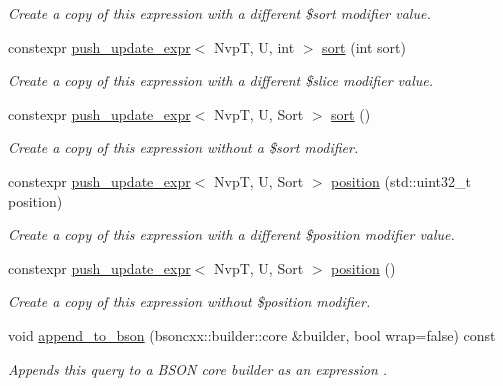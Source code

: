 \begin{DoxyCompactItemize}
\begin{DoxyCompactList}\small\item\em Create a copy of this expression with a different \$sort modifier value. \end{DoxyCompactList}\item 
constexpr \hyperlink{classmongo__odm_1_1push__update__expr}{push\+\_\+update\+\_\+expr}$<$ NvpT, U, int $>$ \hyperlink{classmongo__odm_1_1push__update__expr_a690edf21a68ce63bd576cc94e9a34f0f}{sort} (int sort)
\begin{DoxyCompactList}\small\item\em Create a copy of this expression with a different \$slice modifier value. \end{DoxyCompactList}\item 
constexpr \hyperlink{classmongo__odm_1_1push__update__expr}{push\+\_\+update\+\_\+expr}$<$ NvpT, U, Sort $>$ \hyperlink{classmongo__odm_1_1push__update__expr_a95965b5ab76f0e6da15de477fad2e829}{sort} ()
\begin{DoxyCompactList}\small\item\em Create a copy of this expression without a \$sort modifier. \end{DoxyCompactList}\item 
constexpr \hyperlink{classmongo__odm_1_1push__update__expr}{push\+\_\+update\+\_\+expr}$<$ NvpT, U, Sort $>$ \hyperlink{classmongo__odm_1_1push__update__expr_adb225c5e9549be9c7d790aff4bdcf856}{position} (std\+::uint32\+\_\+t position)
\begin{DoxyCompactList}\small\item\em Create a copy of this expression with a different \$position modifier value. \end{DoxyCompactList}\item 
constexpr \hyperlink{classmongo__odm_1_1push__update__expr}{push\+\_\+update\+\_\+expr}$<$ NvpT, U, Sort $>$ \hyperlink{classmongo__odm_1_1push__update__expr_a3875e3422e3c659c1bcc71a3632058b7}{position} ()
\begin{DoxyCompactList}\small\item\em Create a copy of this expression without \$position modifier. \end{DoxyCompactList}\item 
void \hyperlink{classmongo__odm_1_1push__update__expr_afa0ecdb64932eff8dd929b7f108a1441}{append\+\_\+to\+\_\+bson} (bsoncxx\+::builder\+::core \&builder, bool wrap=false) const 
\begin{DoxyCompactList}\small\item\em Appends this query to a B\+S\+ON core builder as an expression \textquotesingle{}. \end{DoxyCompactList}\end{DoxyCompactItemize}


